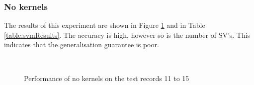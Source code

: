 \subsubsection{No kernels}
	The results of this experiment are shown in Figure \ref{fig:svmExperimentNoKernels} and in Table \ref{table:svmResults}. The accuracy is high, however so is the number of SV's. This indicates that the generalisation guarantee is poor.
	\begin{figure}[htb]
		\centering
		 \\
		\caption{Performance of no kernels on the test records 11 to 15}
		\label{fig:svmExperimentNoKernels}
	\end{figure}

